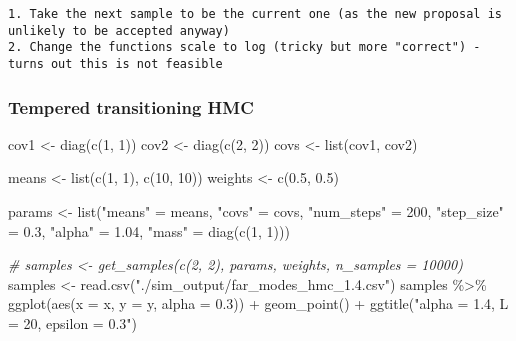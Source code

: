 \documentclass[
]{article}
\newenvironment{Shaded}{\begin{snugshade}}{\end{snugshade}}
\newcommand{\AttributeTok}[1]{\textcolor[rgb]{0.77,0.63,0.00}{#1}}
\newcommand{\CommentTok}[1]{\textcolor[rgb]{0.56,0.35,0.01}{\textit{#1}}}
\newcommand{\DecValTok}[1]{\textcolor[rgb]{0.00,0.00,0.81}{#1}}
\newcommand{\FloatTok}[1]{\textcolor[rgb]{0.00,0.00,0.81}{#1}}
\newcommand{\FunctionTok}[1]{\textcolor[rgb]{0.00,0.00,0.00}{#1}}
\newcommand{\NormalTok}[1]{#1}
\newcommand{\OtherTok}[1]{\textcolor[rgb]{0.56,0.35,0.01}{#1}}
\newcommand{\SpecialCharTok}[1]{\textcolor[rgb]{0.00,0.00,0.00}{#1}}
\newcommand{\StringTok}[1]{\textcolor[rgb]{0.31,0.60,0.02}{#1}}
\begin{document}
\begin{verbatim}
1. Take the next sample to be the current one (as the new proposal is unlikely to be accepted anyway)
2. Change the functions scale to log (tricky but more "correct") - turns out this is not feasible 
\end{verbatim}

\hypertarget{tempered-transitioning-hmc}{%
\subsubsection{Tempered transitioning
HMC}\label{tempered-transitioning-hmc}}

\begin{Shaded}
\begin{Highlighting}[]
\NormalTok{cov1 }\OtherTok{\textless{}{-}} \FunctionTok{diag}\NormalTok{(}\FunctionTok{c}\NormalTok{(}\DecValTok{1}\NormalTok{, }\DecValTok{1}\NormalTok{))}
\NormalTok{cov2 }\OtherTok{\textless{}{-}} \FunctionTok{diag}\NormalTok{(}\FunctionTok{c}\NormalTok{(}\DecValTok{2}\NormalTok{, }\DecValTok{2}\NormalTok{))}
\NormalTok{covs }\OtherTok{\textless{}{-}} \FunctionTok{list}\NormalTok{(cov1, cov2)}

\NormalTok{means }\OtherTok{\textless{}{-}} \FunctionTok{list}\NormalTok{(}\FunctionTok{c}\NormalTok{(}\DecValTok{1}\NormalTok{, }\DecValTok{1}\NormalTok{), }\FunctionTok{c}\NormalTok{(}\DecValTok{10}\NormalTok{, }\DecValTok{10}\NormalTok{))}
\NormalTok{weights }\OtherTok{\textless{}{-}} \FunctionTok{c}\NormalTok{(}\FloatTok{0.5}\NormalTok{, }\FloatTok{0.5}\NormalTok{)}

\NormalTok{params }\OtherTok{\textless{}{-}} \FunctionTok{list}\NormalTok{(}\StringTok{"means"} \OtherTok{=}\NormalTok{ means, }\StringTok{"covs"} \OtherTok{=}\NormalTok{ covs,}
               \StringTok{"num\_steps"} \OtherTok{=} \DecValTok{200}\NormalTok{,}
               \StringTok{"step\_size"} \OtherTok{=} \FloatTok{0.3}\NormalTok{,}
               \StringTok{"alpha"} \OtherTok{=} \FloatTok{1.04}\NormalTok{,}
               \StringTok{"mass"} \OtherTok{=} \FunctionTok{diag}\NormalTok{(}\FunctionTok{c}\NormalTok{(}\DecValTok{1}\NormalTok{, }\DecValTok{1}\NormalTok{)))}

\CommentTok{\# samples \textless{}{-} get\_samples(c(2, 2), params, weights, n\_samples = 10000)}
\NormalTok{samples }\OtherTok{\textless{}{-}} \FunctionTok{read.csv}\NormalTok{(}\StringTok{"./sim\_output/far\_modes\_hmc\_1.4.csv"}\NormalTok{)}
\NormalTok{samples }\SpecialCharTok{\%\textgreater{}\%}
    \FunctionTok{ggplot}\NormalTok{(}\FunctionTok{aes}\NormalTok{(}\AttributeTok{x =}\NormalTok{ x, }\AttributeTok{y =}\NormalTok{ y, }\AttributeTok{alpha =} \FloatTok{0.3}\NormalTok{)) }\SpecialCharTok{+} \FunctionTok{geom\_point}\NormalTok{() }\SpecialCharTok{+} \FunctionTok{ggtitle}\NormalTok{(}\StringTok{"alpha = 1.4, L = 20, epsilon = 0.3"}\NormalTok{)}
\end{Highlighting}
\end{Shaded}
\end{document}
